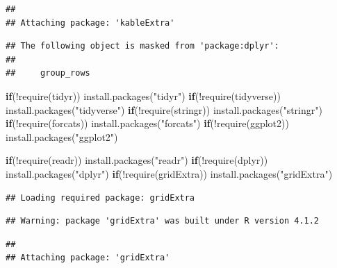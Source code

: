 \documentclass[
]{article}
\newenvironment{Shaded}{}{}
\newcommand{\ControlFlowTok}[1]{\textcolor[rgb]{0.00,0.44,0.13}{\textbf{#1}}}
\newcommand{\FunctionTok}[1]{\textcolor[rgb]{0.02,0.16,0.49}{#1}}
\newcommand{\NormalTok}[1]{#1}
\newcommand{\SpecialCharTok}[1]{\textcolor[rgb]{0.25,0.44,0.63}{#1}}
\newcommand{\StringTok}[1]{\textcolor[rgb]{0.25,0.44,0.63}{#1}}
\begin{document}
\begin{verbatim}
## 
## Attaching package: 'kableExtra'
\end{verbatim}

\begin{verbatim}
## The following object is masked from 'package:dplyr':
## 
##     group_rows
\end{verbatim}

\begin{Shaded}
\begin{Highlighting}[]
\ControlFlowTok{if}\NormalTok{(}\SpecialCharTok{!}\FunctionTok{require}\NormalTok{(tidyr)) }\FunctionTok{install.packages}\NormalTok{(}\StringTok{"tidyr"}\NormalTok{)}
\ControlFlowTok{if}\NormalTok{(}\SpecialCharTok{!}\FunctionTok{require}\NormalTok{(tidyverse)) }\FunctionTok{install.packages}\NormalTok{(}\StringTok{"tidyverse"}\NormalTok{)}
\ControlFlowTok{if}\NormalTok{(}\SpecialCharTok{!}\FunctionTok{require}\NormalTok{(stringr)) }\FunctionTok{install.packages}\NormalTok{(}\StringTok{"stringr"}\NormalTok{)}
\ControlFlowTok{if}\NormalTok{(}\SpecialCharTok{!}\FunctionTok{require}\NormalTok{(forcats)) }\FunctionTok{install.packages}\NormalTok{(}\StringTok{"forcats"}\NormalTok{)}
\ControlFlowTok{if}\NormalTok{(}\SpecialCharTok{!}\FunctionTok{require}\NormalTok{(ggplot2)) }\FunctionTok{install.packages}\NormalTok{(}\StringTok{"ggplot2"}\NormalTok{)}

\ControlFlowTok{if}\NormalTok{(}\SpecialCharTok{!}\FunctionTok{require}\NormalTok{(readr)) }\FunctionTok{install.packages}\NormalTok{(}\StringTok{"readr"}\NormalTok{)}
\ControlFlowTok{if}\NormalTok{(}\SpecialCharTok{!}\FunctionTok{require}\NormalTok{(dplyr)) }\FunctionTok{install.packages}\NormalTok{(}\StringTok{"dplyr"}\NormalTok{)}
\ControlFlowTok{if}\NormalTok{(}\SpecialCharTok{!}\FunctionTok{require}\NormalTok{(gridExtra)) }\FunctionTok{install.packages}\NormalTok{(}\StringTok{"gridExtra"}\NormalTok{)}
\end{Highlighting}
\end{Shaded}

\begin{verbatim}
## Loading required package: gridExtra
\end{verbatim}

\begin{verbatim}
## Warning: package 'gridExtra' was built under R version 4.1.2
\end{verbatim}

\begin{verbatim}
## 
## Attaching package: 'gridExtra'
\end{verbatim}
\end{document}
